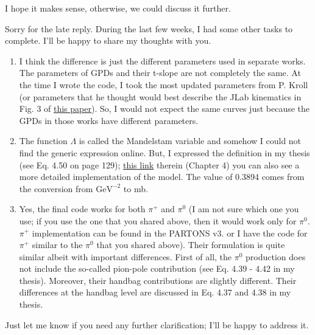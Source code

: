     I hope it makes sense, otherwise, we could discuss it further.
    
    Sorry for the late reply. During the last few weeks, I had some other tasks to complete. I'll be happy to share my thoughts with you.
    
    \begin{enumerate}
        \item I think the difference is just the different parameters used in separate works. The parameters of GPDs and their t-slope are not completely the same. At the time I wrote the code, I took the most updated parameters from P. Kroll (or parameters that he thought would best describe the JLab kinematics in Fig. 3 of \href{https://arxiv.org/pdf/2007.15677.pdf}{this paper}). So, I would not expect the same curves just because the GPDs in those works have different parameters.
    
        \item The function $\Lambda$ is called the Mandelstam variable and somehow I could not find the generic expression online. But, I expressed the definition in my thesis (see Eq. 4.50 on page 129); \href{https://www.osti.gov/biblio/1881460}{this link} therein (Chapter 4) you can also see a more detailed implementation of the model. The value of 0.3894 comes from the conversion from $\text{GeV}^{-2}$ to mb.
    
        \item Yes, the final code works for both $\pi^+$ and $\pi^0$ (I am not sure which one you use; if you use the one that you shared above, then it would work only for $\pi^0$. $\pi^+$ implementation can be found in the PARTONS v3. or I have the code for $\pi^+$ similar to the $\pi^0$ that you shared above). Their formulation is quite similar albeit with important differences. First of all, the $\pi^0$ production does not include the so-called pion-pole contribution (see Eq. 4.39 - 4.42 in my thesis). Moreover, their handbag contributions are slightly different. Their differences at the handbag level are discussed in Eq. 4.37 and 4.38 in my thesis.
    \end{enumerate}
    
    Just let me know if you need any further clarification; I'll be happy to address it.
    
    
    
    
    
    
    

